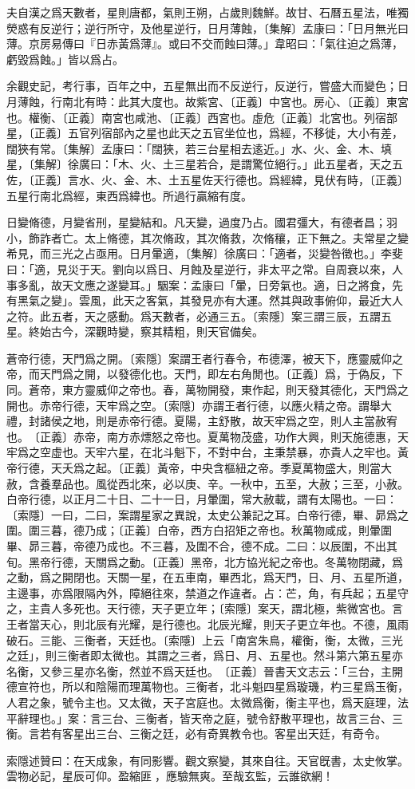 夫自漢之爲天數者，星則唐都，氣則王朔，占歲則魏鮮。故甘、石曆五星法，唯獨熒惑有反逆行；逆行所守，及他星逆行，日月薄蝕，〔集解〕孟康曰：「日月無光曰薄。京房易傳曰『日赤黃爲薄』。或曰不交而蝕曰薄。」韋昭曰：「氣往迫之爲薄，虧毀爲蝕。」皆以爲占。

余觀史記，考行事，百年之中，五星無出而不反逆行，反逆行，嘗盛大而變色；日月薄蝕，行南北有時：此其大度也。故紫宮、〔正義〕中宮也。房心、〔正義〕東宮也。權衡、〔正義〕南宮也咸池、〔正義〕西宮也。虛危〔正義〕北宮也。列宿部星，〔正義〕五官列宿部內之星也此天之五官坐位也，爲經，不移徙，大小有差，闊狹有常。〔集解〕孟康曰：「闊狹，若三台星相去逺近。」水、火、金、木、填星，〔集解〕徐廣曰：「木、火、土三星若合，是謂驚位絕行。」此五星者，天之五佐，〔正義〕言水、火、金、木、土五星佐天行德也。爲經緯，見伏有時，〔正義〕五星行南北爲經，東西爲緯也。所過行贏縮有度。

日變脩德，月變省刑，星變結和。凡天變，過度乃占。國君彊大，有德者昌；羽小，飾詐者亡。太上脩德，其次脩政，其次脩救，次脩穰，正下無之。夫常星之變希見，而三光之占亟用。日月暈適，〔集解〕徐廣曰：「適者，災變咎徵也。」李斐曰：「適，見災于天。劉向以爲日、月蝕及星逆行，非太平之常。自周衰以來，人事多亂，故天文應之遂變耳。」駰案：孟康曰「暈，日旁氣也。適，日之將食，先有黑氣之變」。雲風，此天之客氣，其發見亦有大運。然其與政事俯仰，最近大人之符。此五者，天之感動。爲天數者，必通三五。〔索隱〕案三謂三辰，五謂五星。終始古今，深觀時變，察其精粗，則天官備矣。

蒼帝行德，天門爲之開。〔索隱〕案謂王者行春令，布德澤，被天下，應靈威仰之帝，而天門爲之開，以發德化也。天門，即左右角閒也。〔正義〕爲，于偽反，下同。蒼帝，東方靈威仰之帝也。春，萬物開發，東作起，則天發其德化，天門爲之開也。赤帝行德，天牢爲之空。〔索隱〕亦謂王者行德，以應火精之帝。謂舉大禮，封諸侯之地，則是赤帝行德。夏陽，主舒散，故天牢爲之空，則人主當赦宥也。　〔正義〕赤帝，南方赤熛怒之帝也。夏萬物茂盛，功作大興，則天施德惠，天牢爲之空虛也。天牢六星，在北斗魁下，不對中台，主秉禁暴，亦貴人之牢也。黃帝行德，天夭爲之起。〔正義〕黃帝，中央含樞紐之帝。季夏萬物盛大，則當大赦，含養羣品也。風從西北來，必以庚、辛。一秋中，五至，大赦；三至，小赦。白帝行德，以正月二十日、二十一日，月暈圍，常大赦載，謂有太陽也。一曰：〔索隱〕一曰，二曰，案謂星家之異說，太史公兼記之耳。白帝行德，畢、昴爲之圍。圍三暮，德乃成；〔正義〕白帝，西方白招矩之帝也。秋萬物咸成，則暈圍畢、昴三暮，帝德乃成也。不三暮，及圍不合，德不成。二曰：以辰圍，不出其旬。黑帝行德，天關爲之動。〔正義〕黑帝，北方協光紀之帝也。冬萬物閉藏，爲之動，爲之開閉也。天關一星，在五車南，畢西北，爲天門，日、月、五星所道，主邊事，亦爲限隔內外，障絕往來，禁道之作違者。占：芒，角，有兵起；五星守之，主貴人多死也。天行德，天子更立年；〔索隱〕案天，謂北極，紫微宮也。言王者當天心，則北辰有光耀，是行德也。北辰光耀，則天子更立年也。不德，風雨破石。三能、三衡者，天廷也。〔索隱〕上云「南宮朱鳥，權衡，衡，太微，三光之廷」，則三衡者即太微也。其謂之三者，爲日、月、五星也。然斗第六第五星亦名衡，又參三星亦名衡，然並不爲天廷也。　〔正義〕晉書天文志云：「三台，主開德宣符也，所以和陰陽而理萬物也。三衡者，北斗魁四星爲璇璣，杓三星爲玉衡，人君之象，號令主也。又太微，天子宮庭也。太微爲衡，衡主平也，爲天庭理，法平辭理也。」案：言三台、三衡者，皆天帝之庭，號令舒散平理也，故言三台、三衡。言若有客星出三台、三衡之廷，必有奇異教令也。客星出天廷，有奇令。

索隱述贊曰：在天成象，有同影響。觀文察變，其來自往。天官旣書，太史攸掌。雲物必記，星辰可仰。盈縮匪𠎱，應驗無爽。至哉玄監，云誰欲網！